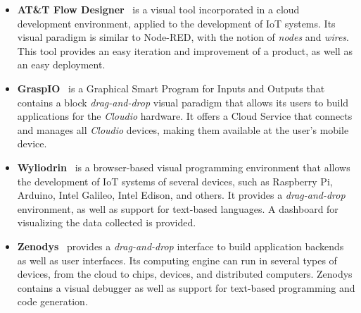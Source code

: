 \begin{itemize}
\item\textbf{AT\&T Flow Designer}~\cite{attflowdesigner} is a visual tool incorporated in a cloud development environment, applied to the development of IoT systems. Its visual paradigm is similar to Node-RED, with the notion of \textit{nodes} and \textit{wires}. This tool provides an easy iteration and improvement of a product, as well as an easy deployment.

\item\textbf{GraspIO}~\cite{graspio} is a Graphical Smart Program for Inputs and Outputs that contains a block \textit{drag-and-drop} visual paradigm that allows its users to build applications for the \textit{Cloudio} hardware. It offers a Cloud Service that connects and manages all \textit{Cloudio} devices, making them available at the user's mobile device.

\item\textbf{Wyliodrin}~\cite{wyliodrin} is a browser-based visual programming environment that allows the development of IoT systems of several devices, such as Raspberry Pi, Arduino, Intel Galileo, Intel Edison, and others. It provides a \textit{drag-and-drop} environment, as well as support for text-based languages. A dashboard for visualizing the data collected is provided.

\item\textbf{Zenodys}~\cite{zenodys} provides a \textit{drag-and-drop} interface to build application backends as well as user interfaces. Its computing engine can run in several types of devices, from the cloud to chips, devices, and distributed computers. Zenodys contains a visual debugger as well as support for text-based programming and code generation. 
\end{itemize}

